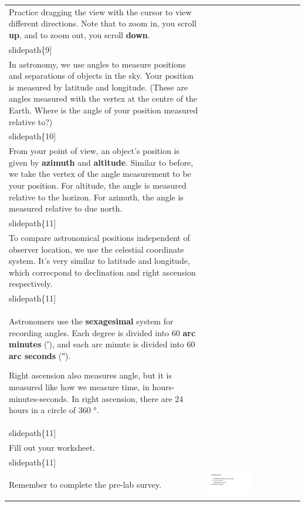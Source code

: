 \documentclass[12pt]{article}
\begin{document}
\begin{longtable}{|m{}|m{}|}
Practice dragging the view with the cursor to view different directions. Note that to zoom in, you scroll \textbf{up}, and to zoom out, you scroll \textbf{down}. & \texttt{[image: \\slidepath\{9]}}\\\hline
In astronomy, we use angles to measure positions and separations of objects in the sky. Your position is measured by latitude and longitude. (These are angles measured with the vertex at the centre of the Earth. Where is the angle of your position measured relative to?) & \texttt{[image: \\slidepath\{10]}}\\\hline
From your point of view, an object's position is given by \textbf{azimuth} and \textbf{altitude}. Similar to before, we take the vertex of the angle measurement to be your position. For altitude, the angle is measured relative to the horizon. For azimuth, the angle is measured relative to due north. & \texttt{[image: \\slidepath\{11]}}\\\hline
To compare astronomical positions independent of observer location, we use the celestial coordinate system. It's very similar to latitude and longitude, which correcpond to declination and right ascension respectively. & \texttt{[image: \\slidepath\{11]}}\\\hline
Astronomers use the \textbf{sexagesimal} system for recording angles. Each degree is divided into 60 \textbf{arc minutes} (\si{\arcminute}), and each arc minute is divided into 60 \textbf{arc seconds} (\si{\arcsecond}).

Right ascension also measures angle, but it is measured like how we measure time, in hours-minutes-seconds. In right ascension, there are 24 hours in a circle of 360 \si{\degree}. & \texttt{[image: \\slidepath\{11]}}\\\hline
Fill out your worksheet. & \texttt{[image: \\slidepath\{11]}}\\\hline


Remember to complete the pre-lab survey. & \includegraphics[width=0.5\textwidth]{ppt/lab01/Slide15.jpeg}\\\hline
\end{longtable}
\end{document}
